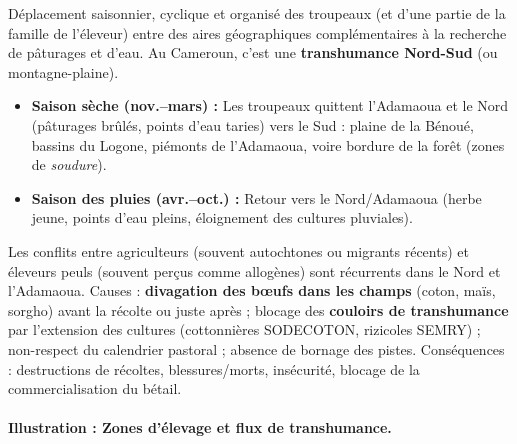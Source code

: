 \documentclass[11pt]{article}
\begin{document}
\begin{definition}[Transhumance]
Déplacement saisonnier, cyclique et organisé des troupeaux (et d'une partie de la famille de l'éleveur) entre des aires géographiques complémentaires à la recherche de pâturages et d'eau. Au Cameroun, c'est une \textbf{transhumance Nord-Sud} (ou montagne-plaine).
\end{definition}

\begin{itemize}
    \item \textbf{Saison sèche (nov.--mars) :} Les troupeaux quittent l'Adamaoua et le Nord (pâturages brûlés, points d'eau taries) vers le Sud : plaine de la Bénoué, bassins du Logone, piémonts de l'Adamaoua, voire bordure de la forêt (zones de \emph{soudure}).
    \item \textbf{Saison des pluies (avr.--oct.) :} Retour vers le Nord/Adamaoua (herbe jeune, points d'eau pleins, éloignement des cultures pluviales).
\end{itemize}

\begin{savaistu}
Les conflits entre agriculteurs (souvent autochtones ou migrants récents) et éleveurs peuls (souvent perçus comme allogènes) sont récurrents dans le Nord et l'Adamaoua. Causes : \textbf{divagation des bœufs dans les champs} (coton, maïs, sorgho) avant la récolte ou juste après ; blocage des \textbf{couloirs de transhumance} par l'extension des cultures (cottonnières SODECOTON, rizicoles SEMRY) ; non-respect du calendrier pastoral ; absence de bornage des pistes. Conséquences : destructions de récoltes, blessures/morts, insécurité, blocage de la commercialisation du bétail.
\end{savaistu}

\paragraph{Illustration : Zones d'élevage et flux de transhumance.}
\end{document}
